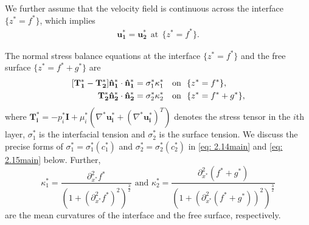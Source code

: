 \documentclass[11pt]{article}
\numberwithin{equation}{section}
\newtheorem{counter example}[theorem]{Counter Example}
\begin{document}
{We further assume that the velocity field is continuous across the  interface $\{z^*=f^*\}$, which implies 
\begin{align}
\mathbf{u_1^*}=\mathbf{u_2^*}~~\mathrm{at}~~ \{z^*=f^*\}.
\end{align} 

The normal stress balance equations at the interface $\{z^*=f^*\}$ and the free surface $\{z^*=f^*+g^*\}$ are
\begin{align}\label{eq: 9}
    \mathbf{[T_1^* -T_2^*]\hat{n}_1^*\cdot \hat{n}_1^*}&=\sigma_1^* \kappa_1^* ~~~\mathrm{on}~~\{z^*=f^*\},\\
    \hspace{1.1 cm}\mathbf{T_2^*\hat{n}_2^*\cdot \hat{n}_2^*}&=\sigma_2^* \kappa_2^* ~~~\mathrm{on}~~\{z^*=f^*+g^*\},\nonumber
\end{align}
where $\mathbf{T_i^*}=-p_i^* \mathbf{I}+\mu_i^*(\nabla^* \mathbf{u^*_i}+(\nabla^* \mathbf{u^*_i})^T)$ denotes the stress tensor in the $i${th} layer, $\sigma_1^*$ is the interfacial tension and $\sigma_2^*$ is the surface tension. We discuss the precise forms of $\sigma_1^*=\sigma^*_1(c_1^*)$ and $\sigma_2^*= \sigma_2^*(c^*_2)$  in \eqref{eq: 2.14main} and \eqref{eq: 2.15main} below. Further, \[
\kappa^*_1=\dfrac{\partial_{x^*}^2 f^*}{(1+(\partial_{x^*}^2 f^*)^2)^{\frac{3}{2}}}   \text{ and }\kappa_2^*=\dfrac{\partial_{x^*}^2 (f^*+g^*)}{(1+(\partial_{x^*}^2 (f^*+g^*))^2)^{\frac{3}{2}}}\] 
are the mean curvatures of the interface and the free surface, respectively.

}
\end{document}
